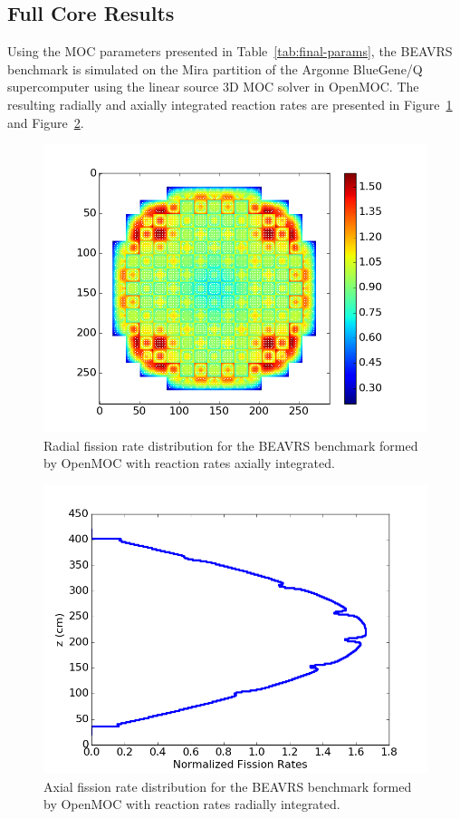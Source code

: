 \documentclass[12pt,twoside]{mitthesis-exec}
\begin{document}
\newpage
\subsection*{Full Core Results}


Using the MOC parameters presented in Table~\ref{tab:final-params}, the BEAVRS benchmark is simulated on the Mira partition of the Argonne BlueGene/Q supercomputer using the linear source 3D MOC solver in OpenMOC. The resulting radially and axially integrated reaction rates are presented in Figure~\ref{fig:full-core-radial} and Figure~\ref{fig:full-core-axial}.

\begin{figure}[ht!]
	\centering
	\includegraphics[width=0.65\linewidth]{figures/results/rr-plots/beavrs-3d-radial.png}
	\caption{Radial fission rate distribution for the BEAVRS benchmark formed by OpenMOC with reaction rates axially integrated.}
	\label{fig:full-core-radial}
\end{figure}

\begin{figure}[ht!]
	\centering
	\includegraphics[width=0.65\linewidth]{figures/results/rr-plots/beavrs-3d-axial.png}
	\caption{Axial fission rate distribution for the BEAVRS benchmark formed by OpenMOC with reaction rates radially integrated.}
	\label{fig:full-core-axial}
\end{figure}
\end{document}
